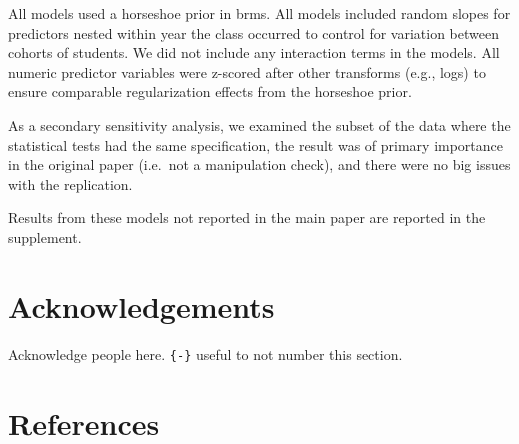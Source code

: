 \documentclass[
  english,
  a4paper,
]{article}
\begin{document}
All models used a horseshoe prior in brms. All models included random slopes for predictors nested within year the class occurred to control for variation between cohorts of students. We did not include any interaction terms in the models. All numeric predictor variables were z-scored after other transforms (e.g., logs) to ensure comparable regularization effects from the horseshoe prior.

As a secondary sensitivity analysis, we examined the subset of the data where the statistical tests had the same specification, the result was of primary importance in the original paper (i.e.~not a manipulation check), and there were no big issues with the replication.

Results from these models not reported in the main paper are reported in the supplement.

\hypertarget{acknowledgements}{%
\section*{Acknowledgements}\label{acknowledgements}}

Acknowledge people here. \texttt{\{-\}} useful to not number this section.

\hypertarget{references}{%
\section*{References}\label{references}}
\end{document}

